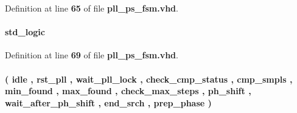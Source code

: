 Definition at line {\bf 65} of file {\bf pll\+\_\+ps\+\_\+fsm.\+vhd}.

\paragraph[{smpl\+\_\+cmp\+\_\+en\+\_\+reg}]{ {\bfseries \textcolor{comment}{std\+\_\+logic}\textcolor{vhdlchar}{ }} \hspace{0.3cm}{\ttfamily [Signal]}}\label{classpll__ps__fsm_1_1arch_a0cd142ac3eee354ac61abdc2a46b022b}


Definition at line {\bf 69} of file {\bf pll\+\_\+ps\+\_\+fsm.\+vhd}.

\paragraph[{state\+\_\+type}]{ {\bfseries \textcolor{vhdlchar}{(}\textcolor{vhdlchar}{ }\textcolor{vhdlchar}{idle}\textcolor{vhdlchar}{ }\textcolor{vhdlchar}{,}\textcolor{vhdlchar}{ }\textcolor{vhdlchar}{rst\+\_\+pll}\textcolor{vhdlchar}{ }\textcolor{vhdlchar}{,}\textcolor{vhdlchar}{ }\textcolor{vhdlchar}{wait\+\_\+pll\+\_\+lock}\textcolor{vhdlchar}{ }\textcolor{vhdlchar}{,}\textcolor{vhdlchar}{ }\textcolor{vhdlchar}{check\+\_\+cmp\+\_\+status}\textcolor{vhdlchar}{ }\textcolor{vhdlchar}{,}\textcolor{vhdlchar}{ }\textcolor{vhdlchar}{cmp\+\_\+smpls}\textcolor{vhdlchar}{ }\textcolor{vhdlchar}{,}\textcolor{vhdlchar}{ }\textcolor{vhdlchar}{min\+\_\+found}\textcolor{vhdlchar}{ }\textcolor{vhdlchar}{,}\textcolor{vhdlchar}{ }\textcolor{vhdlchar}{max\+\_\+found}\textcolor{vhdlchar}{ }\textcolor{vhdlchar}{,}\textcolor{vhdlchar}{ }\textcolor{vhdlchar}{check\+\_\+max\+\_\+steps}\textcolor{vhdlchar}{ }\textcolor{vhdlchar}{,}\textcolor{vhdlchar}{ }\textcolor{vhdlchar}{ph\+\_\+shift}\textcolor{vhdlchar}{ }\textcolor{vhdlchar}{,}\textcolor{vhdlchar}{ }\textcolor{vhdlchar}{wait\+\_\+after\+\_\+ph\+\_\+shift}\textcolor{vhdlchar}{ }\textcolor{vhdlchar}{,}\textcolor{vhdlchar}{ }\textcolor{vhdlchar}{end\+\_\+srch}\textcolor{vhdlchar}{ }\textcolor{vhdlchar}{,}\textcolor{vhdlchar}{ }\textcolor{vhdlchar}{prep\+\_\+phase}\textcolor{vhdlchar}{ }\textcolor{vhdlchar}{)}\textcolor{vhdlchar}{ }} \hspace{0.3cm}{\ttfamily [Type]}}\label{classpll__ps__fsm_1_1arch_aad011a03e3d447a7944154f08342870a}


